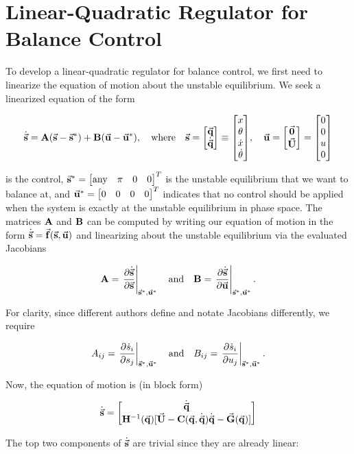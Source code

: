 \documentclass{article}
\begin{document}
    \section{Linear-Quadratic Regulator for Balance Control}

    To develop a linear-quadratic regulator for balance control, we first need to linearize the equation of motion about the unstable equilibrium.
    We seek a linearized equation of the form

    \[
        \dot{\va{s}} = \vb{A}(\va{s} - \va{s}^*) + \vb{B}(\va{u} - \va{u}^*) ,\qq{where} \va{s} = \mqty[\va{q} \\ \dot{\va{q}}] \equiv \mqty[x \\ \theta \\ \dot{x} \\ \dot{\theta}] \qc \va{u} = \mqty[\va{0} \\ \va{U}] = \mqty[0 \\ 0 \\ u \\ 0]
    \]

    is the control, $\va{s}^* = \mqty[\text{any} & \pi & 0 & 0]^T$ is the unstable equilibrium that we want to balance at, and $\va{u}^* = \mqty[0 & 0 & 0 & 0]^T$ indicates that no control should be applied when the system is exactly at the unstable equilibrium in phase space.
    The matrices $\vb{A}$ and $\vb{B}$ can be computed by writing our equation of motion in the form $\dot{\va{s}} = \va{f}(\va{s}, \va{u})$ and linearizing about the unstable equilibrium via the evaluated Jacobians

    \[
        \vb{A} = \eval{\pdv{\dot{\va{s}}}{\va{s}}}_{\va{s}^*, \va{u}^*} \qq{and} \vb{B} = \eval{\pdv{\dot{\va{s}}}{\va{u}}}_{\va{s}^*, \va{u}^*}.
    \]

    For clarity, since different authors define and notate Jacobians differently, we require

    \[
        A_{ij} = \eval{\pdv{\dot{s}_i}{s_j}}_{\va{s}^*, \va{u}^*} \qq{and} B_{ij} = \eval{\pdv{\dot{s}_i}{u_j}}_{\va{s}^*, \va{u}^*}.
    \]

    Now, the equation of motion is (in block form)

    \[
        \dot{\va{s}} = \mqty[\dot{\va{q}} \\ \vb{H}^{-1}(\va{q})[\va{U} - \vb{C}(\va{q}, \dot{\va{q}})\dot{\va{q}} - \va{G}(\va{q})]]
    \]

    The top two components of $\dot{\va{s}}$ are trivial since they are already linear:
\end{document}
